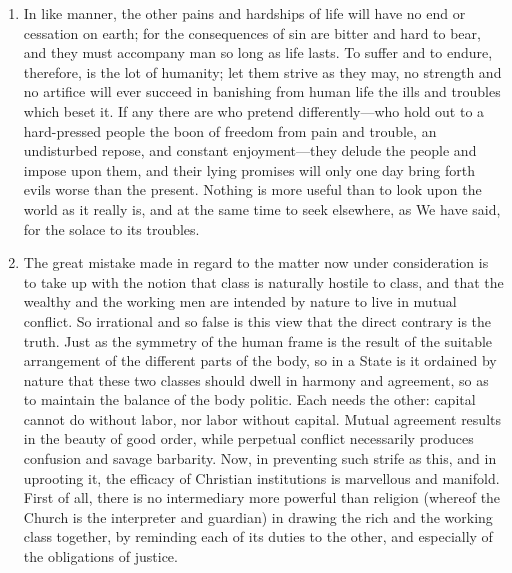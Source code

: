 \documentclass{book}
\begin{document}
\begin{enumerate}
	\item In like manner, the other pains and hardships of life will have no end or cessation on earth; for the consequences of sin are bitter and hard to bear, and they must accompany man so long as life lasts. To suffer and to endure, therefore, is the lot of humanity; let them strive as they may, no strength and no artifice will ever succeed in banishing from human life the ills and troubles which beset it. If any there are who pretend differently—who hold out to a hard-pressed people the boon of freedom from pain and trouble, an undisturbed repose, and constant enjoyment—they delude the people and impose upon them, and their lying promises will only one day bring forth evils worse than the present. Nothing is more useful than to look upon the world as it really is, and at the same time to seek elsewhere, as We have said, for the solace to its troubles.


	\item The great mistake made in regard to the matter now under consideration is to take up with the notion that class is naturally hostile to class, and that the wealthy and the working men are intended by nature to live in mutual conflict. So irrational and so false is this view that the direct contrary is the truth. Just as the symmetry of the human frame is the result of the suitable arrangement of the different parts of the body, so in a State is it ordained by nature that these two classes should dwell in harmony and agreement, so as to maintain the balance of the body politic. Each needs the other: capital cannot do without labor, nor labor without capital. Mutual agreement results in the beauty of good order, while perpetual conflict necessarily produces confusion and savage barbarity. Now, in preventing such strife as this, and in uprooting it, the efficacy of Christian institutions is marvellous and manifold. First of all, there is no intermediary more powerful than religion (whereof the Church is the interpreter and guardian) in drawing the rich and the working class together, by reminding each of its duties to the other, and especially of the obligations of justice.



\end{enumerate}
\end{document}
